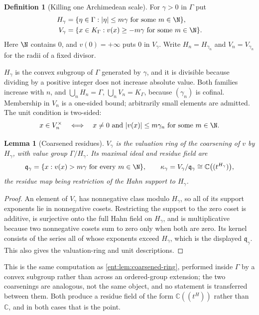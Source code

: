 \documentclass[11pt]{article}
\theoremstyle{plain}
\newtheorem{lemma}[lemma]{Lemma}
\theoremstyle{plain}
\theoremstyle{plain}
\theoremstyle{definition}
\newtheorem{definition}[definition]{Definition}
\theoremstyle{definition}
\theoremstyle{definition}
\theoremstyle{definition}
\theoremstyle{remark}
\newcommand{\C}{\mathbb C}\newcommand{\R}{\mathbb R}
\newcommand{\K}{K_\Gamma}\newcommand{\KD}{K_\Delta}
\newcommand{\abs}[1]{\lvert#1\rvert}
\begin{document}
\begin{definition}[Killing one Archimedean scale]\label{ent:def:coarse}
For $\gamma>0$ in $\Gamma$ put
\begin{align}
 H_\gamma&=\{\eta\in\Gamma:\abs{\eta}\le m\gamma\text{ for some }m\in\N\},
 \label{ent:eq:Hgamma}\\
 V_\gamma&=\{x\in\K:v(x)\ge-m\gamma\text{ for some }m\in\N\}.
 \label{ent:eq:Vgamma}
\end{align}
Here $\N$ contains $0$, and $v(0)=+\infty$ puts $0$ in $V_\gamma$. Write
$H_n=H_{\gamma_n}$ and $V_n=V_{\gamma_n}$ for the radii of a fixed divisor.
\end{definition}

$H_\gamma$ is the convex subgroup of $\Gamma$ generated by $\gamma$, and it is
divisible because dividing by a positive integer does not increase absolute
value. Both families increase with $n$, and
$\bigcup_nH_n=\Gamma$, $\bigcup_nV_n=\K$, because $(\gamma_n)$ is cofinal.
Membership in $V_n$ is a one-sided bound; arbitrarily small elements are
admitted. The unit condition is two-sided:
\begin{equation}\label{ent:eq:Vunits}
 x\in V_n^\times
 \quad\Longleftrightarrow\quad
 x\ne0\text{ and }\abs{v(x)}\le m\gamma_n\text{ for some }m\in\N .
\end{equation}

\begin{lemma}[Coarsened residues]\label{ent:lem:coarse-residue}
$V_\gamma$ is the valuation ring of the coarsening of $v$ by $H_\gamma$, with
value group $\Gamma/H_\gamma$. Its maximal ideal and residue field are
\[
 \mathfrak q_\gamma=\{x:v(x)>m\gamma\text{ for every }m\in\N\},
 \qquad
 \kappa_\gamma=V_\gamma/\mathfrak q_\gamma\cong\C\bigl((t^{H_\gamma})\bigr),
\]
the residue map being restriction of the Hahn support to $H_\gamma$.
\end{lemma}
\begin{proof}
An element of $V_\gamma$ has nonnegative class modulo $H_\gamma$, so all of
its support exponents lie in nonnegative cosets. Restricting the support to
the zero coset is additive, is surjective onto the full Hahn field on
$H_\gamma$, and is multiplicative because two nonnegative cosets sum to zero
only when both are zero. Its kernel consists of the series all of whose
exponents exceed $H_\gamma$, which is the displayed $\mathfrak q_\gamma$.
This also gives the valuation-ring and unit descriptions.
\end{proof}

This is the same computation as \cref{ent:lem:coarsened-ring}, performed
inside $\Gamma$ by a convex subgroup rather than across an ordered-group
extension; the two coarsenings are analogous, not the same object, and no
statement is transferred between them. Both produce a residue field of the
form $\C((t^H))$ rather than $\C$, and in both cases that is the point.
\end{document}
